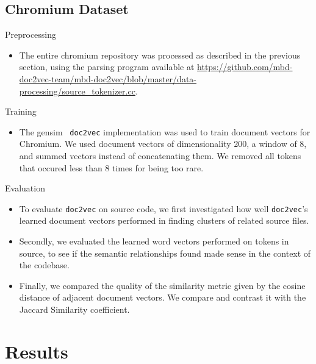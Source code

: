 \documentclass[11pt]{article}
\begin{document}
\subsection*{Chromium Dataset}
\begin{description}
  \item Preprocessing
    \begin{itemize}
      \item The entire chromium repository was processed as described in
            the previous section, using the parsing program available at
            \url{https://github.com/mbd-doc2vec-team/mbd-doc2vec/blob/master/data-processing/source_tokenizer.cc}.
    \end{itemize}
  \item Training
    \begin{itemize}
      \item The gensim~\cite{gensim} \texttt{doc2vec} implementation was used
            to train document vectors for Chromium. We used document
            vectors of dimensionality 200, a window of 8, and summed vectors
            instead of concatenating them. We removed all tokens that occured
            less than 8 times for being too rare.
    \end{itemize}
  \item Evaluation
    \begin{itemize}
      \item To evaluate \texttt{doc2vec} on source code, we first investigated
            how well \texttt{doc2vec}'s learned document vectors performed in
            finding clusters of related source files.
      \item Secondly, we evaluated the learned word vectors performed on tokens
            in source, to see if the semantic relationships found made sense in
            the context of the codebase.
      \item Finally, we compared the quality of the similarity
            metric given by the cosine distance of adjacent document vectors.
            We compare and contrast it with the Jaccard Similarity coefficient.
    \end{itemize}
\end{description}

\renewcommand\labelitemi{\oldlabelitemi}
\section*{Results}
\end{document}
